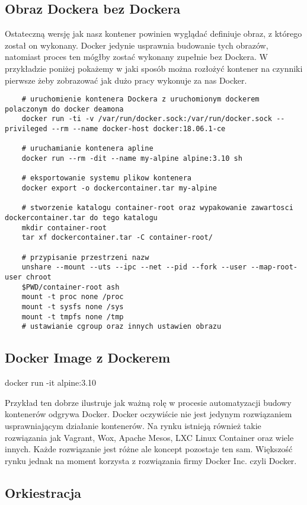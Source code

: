 \subsection{Obraz Dockera bez Dockera}
Ostateczną wersję jak nasz kontener powinien wyglądać definiuje obraz, z którego został on wykonany. Docker jedynie usprawnia budowanie tych obrazów, natomiast proces ten mógłby zostać wykonany zupełnie bez Dockera. W przykładzie poniżej pokażemy w jaki sposób można rozłożyć kontener na czynniki pierwsze żeby zobrazować jak dużo pracy wykonuje za nas Docker.
\begin{lstlisting}
    # uruchomienie kontenera Dockera z uruchomionym dockerem polaczonym do docker deamona
    docker run -ti -v /var/run/docker.sock:/var/run/docker.sock --privileged --rm --name docker-host docker:18.06.1-ce

    # uruchamianie kontenera apline 
    docker run --rm -dit --name my-alpine alpine:3.10 sh

    # eksportowanie systemu plikow kontenera
    docker export -o dockercontainer.tar my-alpine

    # stworzenie katalogu container-root oraz wypakowanie zawartosci dockercontainer.tar do tego katalogu
    mkdir container-root
    tar xf dockercontainer.tar -C container-root/

    # przypisanie przestrzeni nazw
    unshare --mount --uts --ipc --net --pid --fork --user --map-root-user chroot
    $PWD/container-root ash 
    mount -t proc none /proc
    mount -t sysfs none /sys
    mount -t tmpfs none /tmp
    # ustawianie cgroup oraz innych ustawien obrazu
\end{lstlisting}


\subsection{Docker Image z Dockerem}
docker run -it alpine:3.10

Przykład ten dobrze ilustruje jak ważną rolę w procesie automatyzacji budowy kontenerów odgrywa Docker.
Docker oczywiście nie jest jedynym rozwiązaniem usprawniającym działanie kontenerów. Na rynku istnieją również takie rozwiązania jak Vagrant, Wox, Apache Mesos, LXC Linux Container oraz wiele innych. Każde rozwiązanie jest różne ale koncept pozostaje ten sam. Większość rynku jednak na moment korzysta z rozwiązania firmy Docker Inc. czyli Docker.

\subsection{Orkiestracja}

